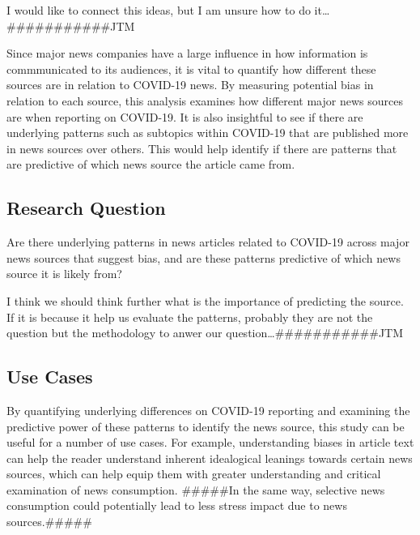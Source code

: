 \documentclass[
]{article}
\begin{document}
I would like to connect this ideas, but I am unsure how to do
it\ldots\#\#\#\#\#\#\#\#\#\#\#JTM

Since major news companies have a large influence in how information is
commmunicated to its audiences, it is vital to quantify how different
these sources are in relation to COVID-19 news. By measuring potential
bias in relation to each source, this analysis examines how different
major news sources are when reporting on COVID-19. It is also insightful
to see if there are underlying patterns such as subtopics within
COVID-19 that are published more in news sources over others. This would
help identify if there are patterns that are predictive of which news
source the article came from.

\hypertarget{research-question-1}{%
\subsection{Research Question}\label{research-question-1}}

Are there underlying patterns in news articles related to COVID-19
across major news sources that suggest bias, and are these patterns
predictive of which news source it is likely from?

I think we should think further what is the importance of predicting the
source. If it is because it help us evaluate the patterns, probably they
are not the question but the methodology to anwer our
question\ldots\#\#\#\#\#\#\#\#\#\#\#JTM

\hypertarget{use-cases}{%
\subsection{Use Cases}\label{use-cases}}

By quantifying underlying differences on COVID-19 reporting and
examining the predictive power of these patterns to identify the news
source, this study can be useful for a number of use cases. For example,
understanding biases in article text can help the reader understand
inherent idealogical leanings towards certain news sources, which can
help equip them with greater understanding and critical examination of
news consumption. \#\#\#\#\#In the same way, selective news consumption
could potentially lead to less stress impact due to news
sources.\#\#\#\#\#
\end{document}
